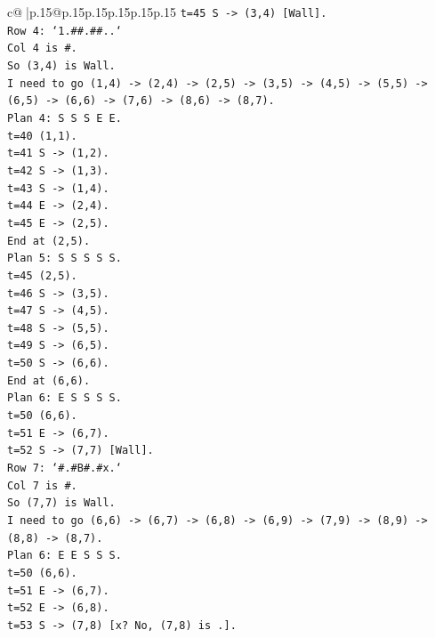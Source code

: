 \documentclass{article}
\begin{document}
{\begin{supertabular}{c@{$\;$}|p{.15\linewidth}@{}p{.15\linewidth}p{.15\linewidth}p{.15\linewidth}p{.15\linewidth}p{.15\linewidth}}
{{{\texttt{t=45 S {-}> (3,4) {[}Wall{]}.} \\
\texttt{Row 4: `1.\#\#.\#\#..`} \\
\texttt{Col 4 is \#.} \\
\texttt{So (3,4) is Wall.} \\
\texttt{I need to go (1,4) {-}> (2,4) {-}> (2,5) {-}> (3,5) {-}> (4,5) {-}> (5,5) {-}> (6,5) {-}> (6,6) {-}> (7,6) {-}> (8,6) {-}> (8,7).} \\
\texttt{Plan 4: S S S E E.} \\
\texttt{t=40 (1,1).} \\
\texttt{t=41 S {-}> (1,2).} \\
\texttt{t=42 S {-}> (1,3).} \\
\texttt{t=43 S {-}> (1,4).} \\
\texttt{t=44 E {-}> (2,4).} \\
\texttt{t=45 E {-}> (2,5).} \\
\texttt{End at (2,5).} \\
\texttt{Plan 5: S S S S S.} \\
\texttt{t=45 (2,5).} \\
\texttt{t=46 S {-}> (3,5).} \\
\texttt{t=47 S {-}> (4,5).} \\
\texttt{t=48 S {-}> (5,5).} \\
\texttt{t=49 S {-}> (6,5).} \\
\texttt{t=50 S {-}> (6,6).} \\
\texttt{End at (6,6).} \\
\texttt{Plan 6: E S S S S.} \\
\texttt{t=50 (6,6).} \\
\texttt{t=51 E {-}> (6,7).} \\
\texttt{t=52 S {-}> (7,7) {[}Wall{]}.} \\
\texttt{Row 7: `\#.\#B\#.\#x.`} \\
\texttt{Col 7 is \#.} \\
\texttt{So (7,7) is Wall.} \\
\texttt{I need to go (6,6) {-}> (6,7) {-}> (6,8) {-}> (6,9) {-}> (7,9) {-}> (8,9) {-}> (8,8) {-}> (8,7).} \\
\texttt{Plan 6: E E S S S.} \\
\texttt{t=50 (6,6).} \\
\texttt{t=51 E {-}> (6,7).} \\
\texttt{t=52 E {-}> (6,8).} \\
\texttt{t=53 S {-}> (7,8) {[}x? No, (7,8) is .{]}.} \\
}}}
\end{supertabular}}
\end{document}
